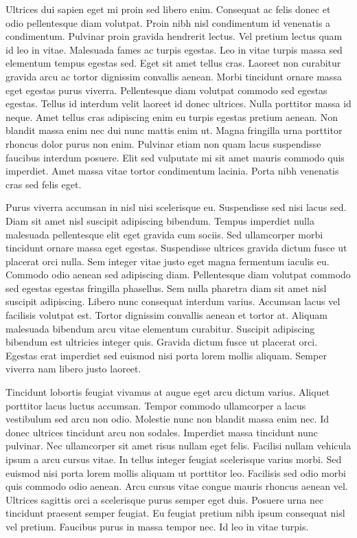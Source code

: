 Ultrices dui sapien eget mi proin sed libero enim. Consequat ac felis
 donec et odio pellentesque diam volutpat. Proin nibh nisl condimentum 
id venenatis a condimentum. Pulvinar proin gravida hendrerit lectus. Vel
 pretium lectus quam id leo in vitae. Malesuada fames ac turpis egestas.
 Leo in vitae turpis massa sed elementum tempus egestas sed. Eget sit 
amet tellus cras. Laoreet non curabitur gravida arcu ac tortor dignissim
 convallis aenean. Morbi tincidunt ornare massa eget egestas purus 
viverra. Pellentesque diam volutpat commodo sed egestas egestas. Tellus 
id interdum velit laoreet id donec ultrices. Nulla porttitor massa id 
neque. Amet tellus cras adipiscing enim eu turpis egestas pretium 
aenean. Non blandit massa enim nec dui nunc mattis enim ut. Magna 
fringilla urna porttitor rhoncus dolor purus non enim. Pulvinar etiam 
non quam lacus suspendisse faucibus interdum posuere. Elit sed vulputate
 mi sit amet mauris commodo quis imperdiet. Amet massa vitae tortor 
condimentum lacinia. Porta nibh venenatis cras sed felis eget.


Purus viverra accumsan in nisl nisi scelerisque eu. Suspendisse sed 
nisi lacus sed. Diam sit amet nisl suscipit adipiscing bibendum. Tempus 
imperdiet nulla malesuada pellentesque elit eget gravida cum sociis. Sed
 ullamcorper morbi tincidunt ornare massa eget egestas. Suspendisse 
ultrices gravida dictum fusce ut placerat orci nulla. Sem integer vitae 
justo eget magna fermentum iaculis eu. Commodo odio aenean sed 
adipiscing diam. Pellentesque diam volutpat commodo sed egestas egestas 
fringilla phasellus. Sem nulla pharetra diam sit amet nisl suscipit 
adipiscing. Libero nunc consequat interdum varius. Accumsan lacus vel 
facilisis volutpat est. Tortor dignissim convallis aenean et tortor at. 
Aliquam malesuada bibendum arcu vitae elementum curabitur. Suscipit 
adipiscing bibendum est ultricies integer quis. Gravida dictum fusce ut 
placerat orci. Egestas erat imperdiet sed euismod nisi porta lorem 
mollis aliquam. Semper viverra nam libero justo laoreet.


Tincidunt lobortis feugiat vivamus at augue eget arcu dictum varius. 
Aliquet porttitor lacus luctus accumsan. Tempor commodo ullamcorper a 
lacus vestibulum sed arcu non odio. Molestie nunc non blandit massa enim
 nec. Id donec ultrices tincidunt arcu non sodales. Imperdiet massa 
tincidunt nunc pulvinar. Nec ullamcorper sit amet risus nullam eget 
felis. Facilisi nullam vehicula ipsum a arcu cursus vitae. In tellus 
integer feugiat scelerisque varius morbi. Sed euismod nisi porta lorem 
mollis aliquam ut porttitor leo. Facilisis sed odio morbi quis commodo 
odio aenean. Arcu cursus vitae congue mauris rhoncus aenean vel. 
Ultrices sagittis orci a scelerisque purus semper eget duis. Posuere 
urna nec tincidunt praesent semper feugiat. Eu feugiat pretium nibh 
ipsum consequat nisl vel pretium. Faucibus purus in massa tempor nec. Id
 leo in vitae turpis.


